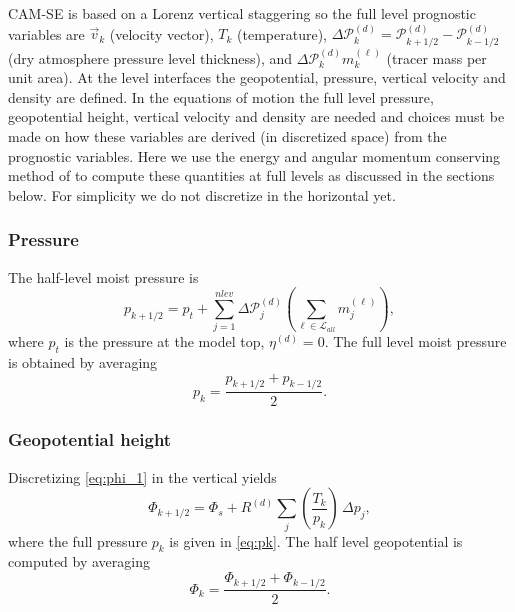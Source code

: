 \documentclass{agujournal}
\begin{document}
CAM-SE is based on a Lorenz vertical staggering so the full level prognostic variables are $\vec{v}_k$ (velocity vector), $T_k$ (temperature), $\Delta \mathcal{P}^{(d)}_k=\mathcal{P}^{(d)}_{k+1/2}-\mathcal{P}^{(d)}_{k-1/2}$ (dry atmosphere pressure level thickness), and $\Delta \mathcal{P}^{(d)}_k m_k^{(\ell)}$ (tracer mass per unit area). At the level interfaces the geopotential, pressure, vertical velocity and density are defined. In the equations of motion the full level pressure, geopotential height, vertical velocity and density are needed and choices must be made on how these variables are derived (in discretized space) from the prognostic variables. Here we use the energy and angular momentum conserving method of \citet{SB1981MWR} to compute these quantities at full levels as discussed in the sections below. For simplicity we do not discretize in the horizontal yet.
\subsubsection{Pressure}\label{sec:pk}
The half-level moist pressure is
\begin{equation}
p_{k+1/2}=p_t+\sum_{j=1}^{nlev}\Delta \mathcal{P}^{(d)}_j \left(\sum_{\ell \in \mathcal{L}_{all}} m_j^{(\ell)}\right),\label{eq:halfpfull}
\end{equation}
where $p_t$ is the pressure at the model top, $\eta^{(d)}=0$.
The full level moist pressure is obtained by averaging \citep{SB1981MWR}
\begin{equation}
p_k=\frac{p_{k+1/2}+p_{k-1/2}}{2}.\label{eq:pk}
\end{equation}
\subsubsection{Geopotential height}
Discretizing \eqref{eq:phi_1} in the vertical yields
\begin{equation}
\Phi_{k+1/2}=\Phi_s+R^{(d)}\sum_j \left( \frac{T_k}{p_k}\right)\, \Delta p_j,
\end{equation}
where the full pressure $p_k$ is given in \eqref{eq:pk}. The half level geopotential is computed by averaging
\begin{equation}
\Phi_k=\frac{\Phi_{k+1/2}+\Phi_{k-1/2}}{2}.
\end{equation}
\end{document}

